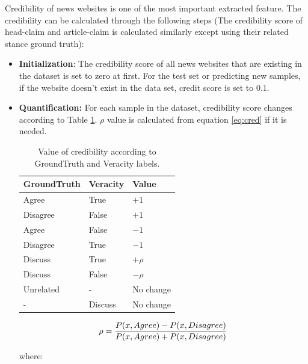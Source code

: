 Credibility of news websites is one of the most important extracted feature. The credibility can be calculated through the following steps (The credibility score of head-claim and article-claim is calculated similarly except using their related stance ground truth):

\begin{itemize}
	\item \textbf{Initialization}: The credibility score of all news websites that are existing in the \cite{stance_persian} dataset is set to zero at first. For the test set or predicting new samples, if the website doesn't exist in the data set, credit score is set to 0.1.


	\item \textbf{Quantification:}
	For each sample in the dataset, credibility score changes according to Table \ref{tbl:cred}. $\rho$ value is calculated from equation \ref{eq:cred} if it is needed.
	\begin{table}[H]
		\centering
		\caption{Value of credibility according to GroundTruth and Veracity labels. }
		\setlength{\extrarowheight}{13pt}%
		\begin{tabular}{|l|l|l|}
			\hline
			GroundTruth & Veracity & Value \\
			\hline
			Agree       & True     & $+1$    \\
			\hline
			Disagree    & False    & $+1$    \\
			\hline
			Agree       & False    & $-1$    \\
			\hline
			Disagree    & True     & $-1$    \\
			\hline
			Discuss     & True     & $+\rho$    \\
			\hline
			Discuss     & False    & $-\rho$   \\
			\hline
			Unrelated     & -   & No change   \\
			\hline
			-     & Discuss    & No change   \\
			\hline
		\end{tabular}
		\label{tbl:cred}
	\end{table}

	\begin{equation}
	\label{eq:cred}
	\rho = \frac{P(x,Agree) - P(x,Disagree)}{P(x,Agree) + P(x,Disagree)}\\
	\end{equation}

where: 
	

\end{itemize}
